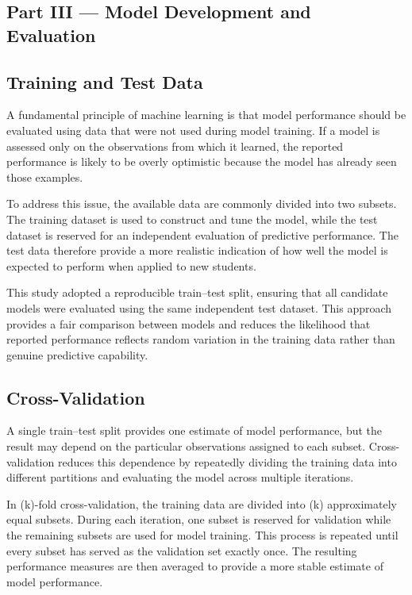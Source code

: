 \subsection*{Part III — Model Development and Evaluation}
\subsection{Training and Test Data}

A fundamental principle of machine learning is that model performance should be evaluated using data that were not used during model training. If a model is assessed 
only on the observations from which it learned, the reported performance is likely to be overly optimistic because the model has already seen those examples.

To address this issue, the available data are commonly divided into two subsets. The training dataset is used to construct and tune the model, while the test dataset is 
reserved for an independent evaluation of predictive performance. The test data therefore provide a more realistic indication of how well the model is expected to perform 
when applied to new students.

This study adopted a reproducible train--test split, ensuring that all candidate models were evaluated using the same independent test dataset. This approach provides a 
fair comparison between models and reduces the likelihood that reported performance reflects random variation in the training data rather than genuine predictive capability.


\subsection{Cross-Validation}

A single train--test split provides one estimate of model performance, but the result may depend on the particular observations assigned to each subset. 
Cross-validation reduces this dependence by repeatedly dividing the training data into different partitions and evaluating the model across multiple iterations.

In (k)-fold cross-validation, the training data are divided into (k) approximately equal subsets. During each iteration, one subset is reserved for validation 
while the remaining subsets are used for model training. This process is repeated until every subset has served as the validation set exactly once. 
The resulting performance measures are then averaged to provide a more stable estimate of model performance.

